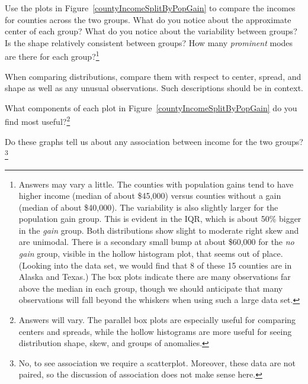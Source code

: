 \begin{exercise} \label{comparingPriceByTypeExercise}
Use the plots in Figure~\ref{countyIncomeSplitByPopGain} to compare the incomes for counties across the two groups. What do you notice about the approximate center of each group? What do you notice about the variability between groups? Is the shape relatively consistent between groups? How many \emph{prominent} modes are there for each group?\footnote{Answers may vary a little. The counties with population gains tend to have higher income (median of about \$45,000) versus counties without a gain (median of about \$40,000). The variability is also slightly larger for the population gain group. This is evident in the IQR, which is about 50\% bigger in the \emph{gain} group. Both distributions show slight to moderate right skew and are unimodal. There is a secondary small bump at about \$60,000 for the \emph{no gain} group, visible in the hollow histogram plot, that seems out of place. (Looking into the data set, we would find that 8 of these 15 counties are in Alaska and Texas.) The box plots indicate there are many observations far above the median in each group, though we should anticipate that many observations will fall beyond the whiskers when using such a large data set.}
\end{exercise}

\begin{tipBox}{
When comparing distributions, compare them with respect to center, spread, and shape as well as any unusual observations. Such descriptions should be in context.}
\end{tipBox}

\begin{exercise}
What components of each plot in Figure~\ref{countyIncomeSplitByPopGain} do you find most useful?\footnote{Answers will vary. The parallel box plots are especially useful for comparing centers and spreads, while the hollow histograms are more useful for seeing distribution shape, skew, and groups of anomalies.}
\end{exercise}

\begin{exercise}
Do these graphs tell us about any association between income for the two groups?\footnote{No, to see association we require a scatterplot. Moreover, these data are not paired, so the discussion of association does not make sense here.}
\end{exercise}

